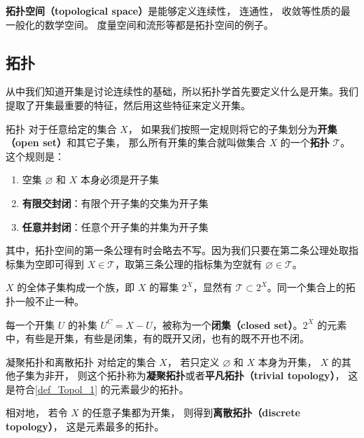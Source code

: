 
\begin{issues}
\issueTODO
\end{issues}



\textbf{拓扑空间（topological space）}是能够定义连续性， 连通性， 收敛等性质的最一般化的数学空间。 度量空间和流形等都是拓扑空间的例子。

\subsection{拓扑}

从中我们知道开集是讨论连续性的基础，所以拓扑学首先要定义什么是开集。我们提取了开集最重要的特征，然后用这些特征来定义开集。

\begin{definition}{拓扑}\label{def_Topol_1}
对于任意给定的集合 $X$， 如果我们按照一定规则将它的子集划分为\textbf{开集（open set）}和其它子集， 那么所有开集的集合就叫做集合 $X$ 的一个\textbf{拓扑} $\mathcal{T}$。 这个规则是：
\begin{enumerate}
\item 空集 $\varnothing$ 和 $X$ 本身必须是开子集
\item \textbf{有限交封闭}：有限个开子集的交集为开子集
\item \textbf{任意并封闭}：任意个开子集的并集为开子集
\end{enumerate}
\end{definition}

其中，拓扑空间的第一条公理有时会略去不写。因为我们只要在第二条公理处取指标集为空即可得到 $X \in \mathcal{T}$，取第三条公理的指标集为空就有 $\varnothing \in \mathcal{T}$。

$X$ 的全体子集构成一个族，即 $X$ 的幂集 $2^X$，显然有 $\mathcal{T}\subset2^X$。同一个集合上的拓扑一般不止一种。

每一个开集 $U$ 的补集 $U^C=X-U$，被称为一个\textbf{闭集（closed set）}。$2^X$ 的元素中，有些是开集，有些是闭集，有的既开又闭，也有的既不开也不闭。

\begin{example}{凝聚拓扑和离散拓扑}
对给定的集合 $X$， 若只定义 $\varnothing$ 和 $X$ 本身为开集， $X$ 的其他子集为非开， 则这个拓扑称为\textbf{凝聚拓扑}或者\textbf{平凡拓扑（trivial topology）}， 这是符合\autoref{def_Topol_1} 的元素最少的拓扑。

相对地， 若令 $X$ 的任意子集都为开集， 则得到\textbf{离散拓扑（discrete topology）}， 这是元素最多的拓扑。
\end{example}

